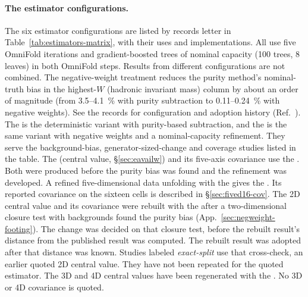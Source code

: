 \paragraph{The estimator configurations.} The six estimator configurations are listed by records letter in Table~\ref{tab:estimators-matrix}, with their uses and implementations. All use five OmniFold iterations and gradient-boosted trees of nominal capacity (100 trees, 8 leaves) in both OmniFold steps. Results from different configurations are not combined. The negative-weight treatment reduces the purity method's nominal-truth bias in the highest-$W$ (hadronic invariant mass) column by about an order of magnitude (from 3.5--\SI{4.1}{\percent} with purity subtraction to 0.11--\SI{0.24}{\percent} with negative weights). See the records for configuration and adoption history (Ref.~\cite{NoteRecords2026}). The \estDetPurity{} is the deterministic variant with purity-based subtraction, and the \estLowCap{} is the same variant with negative weights and a nominal-capacity refinement. They serve the background-bias, generator-sized-change and coverage studies listed in the table. The \resFiveAxis{} (central value, \S\ref{sec:eavailw}) and its five-axis covariance use the \estPurity{}. Both were produced before the purity bias was found and the refinement was developed. A refined five-dimensional data unfolding with the \estMultiD{} gives the \resSixteen{}. Its reported covariance on the sixteen cells is described in \S\ref{sec:fived16-cov}. The 2D central value and its covariance were rebuilt with the \estTwoD{} after a two-dimensional closure test with backgrounds found the purity bias (App.~\ref{sec:negweight-footing}). The change was decided on that closure test, before the rebuilt result's distance from the published result was computed. The rebuilt result was adopted after that distance was known. Studies labeled \emph{exact-split} use that cross-check, an earlier quoted 2D central value. They have not been repeated for the quoted estimator. The 3D and 4D central values have been regenerated with the \estMultiD{}. No 3D or 4D covariance is quoted.
